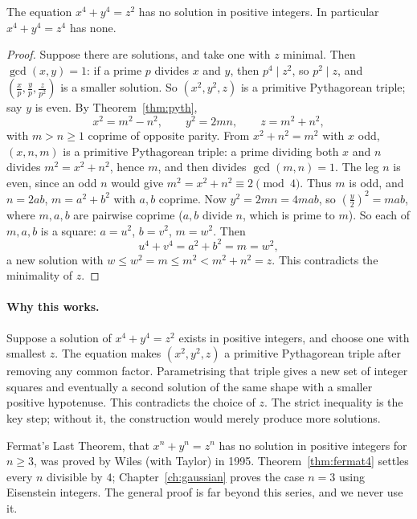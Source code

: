 \begin{theorem}[Fermat]\label{thm:fermat4}
The equation $x^4+y^4=z^2$ has no solution in positive integers. In particular $x^4+y^4=z^4$ has none.
\end{theorem}
\begin{proof}
Suppose there are solutions, and take one with $z$ minimal. Then $\gcd(x,y)=1$: if a prime $p$ divides $x$ and $y$, then $p^4\mid z^2$, so $p^2\mid z$, and $\left(\frac xp,\frac yp,\frac z{p^2}\right)$ is a smaller solution. So $(x^2,y^2,z)$ is a primitive Pythagorean triple; say $y$ is even. By Theorem~\ref{thm:pyth},
\[
x^2=m^2-n^2,\qquad y^2=2mn,\qquad z=m^2+n^2,
\]
with $m>n\ge1$ coprime of opposite parity. From $x^2+n^2=m^2$ with $x$ odd, $(x,n,m)$ is a primitive Pythagorean triple: a prime dividing both $x$ and $n$ divides $m^2=x^2+n^2$, hence $m$, and then divides $\gcd(m,n)=1$. The leg $n$ is even, since an odd $n$ would give $m^2=x^2+n^2\equiv2\pmod4$. Thus $m$ is odd, and $n=2ab$, $m=a^2+b^2$ with $a,b$ coprime. Now $y^2=2mn=4mab$, so $\left(\frac y2\right)^2=mab$, where $m,a,b$ are pairwise coprime ($a,b$ divide $n$, which is prime to $m$). So each of $m,a,b$ is a square: $a=u^2$, $b=v^2$, $m=w^2$. Then
\[
u^4+v^4=a^2+b^2=m=w^2,
\]
a new solution with $w\le w^2=m\le m^2<m^2+n^2=z$. This contradicts the minimality of $z$.
\end{proof}

\paragraph{Why this works.}
Suppose a solution of $x^4+y^4=z^2$ exists in positive integers, and choose one with smallest $z$. The equation makes $(x^2,y^2,z)$ a primitive Pythagorean triple after removing any common factor. Parametrising that triple gives a new set of integer squares and eventually a second solution of the same shape with a smaller positive hypotenuse. This contradicts the choice of $z$. The strict inequality is the key step; without it, the construction would merely produce more solutions.

\begin{remark}
Fermat's Last Theorem, that $x^n+y^n=z^n$ has no solution in positive integers for $n\ge3$, was proved by Wiles (with Taylor) in 1995. Theorem~\ref{thm:fermat4} settles every $n$ divisible by $4$; Chapter~\ref{ch:gaussian} proves the case $n=3$ using Eisenstein integers. The general proof is far beyond this series, and we never use it.
\end{remark}

